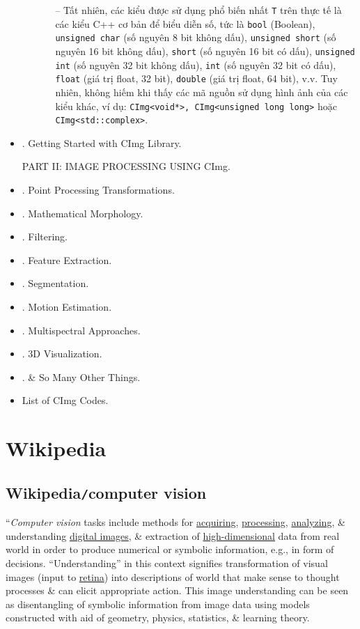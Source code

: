 \documentclass{article}
\begin{document}
\begin{itemize}
\begin{itemize}
\begin{enumerate}
            -- Tất nhiên, các kiểu được sử dụng phổ biến nhất {\tt T} trên thực tế là các kiểu C++ cơ bản để biểu diễn số, tức là {\tt bool} (Boolean), {\tt unsigned char} (số nguyên 8 bit không dấu), {\tt unsigned short} (số nguyên 16 bit không dấu), {\tt short} (số nguyên 16 bit có dấu), {\tt unsigned int} (số nguyên 32 bit không dấu), {\tt int} (số nguyên 32 bit có dấu), {\tt float} (giá trị float, 32 bit), {\tt double} (giá trị float, 64 bit), v.v. Tuy nhiên, không hiếm khi thấy các mã nguồn sử dụng hình ảnh của các kiểu khác, ví dụ: {\tt CImg<void*>, CImg<unsigned long long>} hoặc {\tt CImg<std::complex>}.
        \end{enumerate}
    \end{itemize}
    \item {. Getting Started with CImg Library.}
    
    PART II: IMAGE PROCESSING USING CImg.
    \item {. Point Processing Transformations.}
    \item {. Mathematical Morphology.}
    \item {. Filtering.}
    \item {. Feature Extraction.}
    \item {. Segmentation.}
    \item {. Motion Estimation.}
    \item {. Multispectral Approaches.}
    \item {. 3D Visualization.}
    \item {. \& So Many Other Things.}
    \item {\sf List of CImg Codes.}
\end{itemize}


\section{Wikipedia}

\subsection{Wikipedia{\tt/}computer vision}
``{\it Computer vision} tasks include methods for \href{https://en.wikipedia.org/wiki/Image_sensor}{acquiring}, \href{https://en.wikipedia.org/wiki/Image_processing}{processing}, \href{https://en.wikipedia.org/wiki/Image_analysis}{analyzing}, \& understanding \href{https://en.wikipedia.org/wiki/Digital_image}{digital images}, \& extraction of \href{https://en.wikipedia.org/wiki/High-dimensional}{high-dimensional} data from real world in order to produce numerical or symbolic information, e.g., in form of decisions. ``Understanding'' in this context signifies transformation of visual images (input to \href{https://en.wikipedia.org/wiki/Retina}{retina}) into descriptions of world that make sense to thought processes \& can elicit appropriate action. This image understanding can be seen as disentangling of symbolic information from image data using models constructed with aid of geometry, physics, statistics, \& learning theory.
\end{document}
